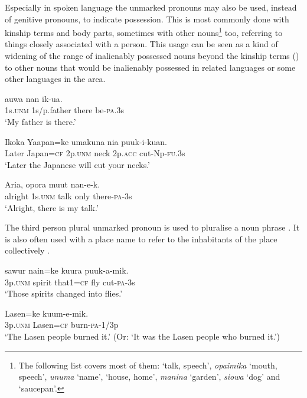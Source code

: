 Especially in spoken language the unmarked pronouns may also be used, instead of genitive pronouns, to indicate possession. This is most commonly done with kinship terms and body parts, sometimes with other nouns\footnote{The following list covers most of them:  `talk, speech', \textit{opaimika} `mouth, speech', \textit{unuma} `name',  `house, home', \textit{manina} `garden', \textit{siowa} `dog' and  `saucepan'.} too, referring to things closely associated with a person. This usage can be seen as a kind of widening of the range of inalienably possessed nouns beyond the kinship terms () to other nouns that would be inalienably possessed in related languages or some other languages in the area. 

\ea%
\label{ex:3:x537}
\gll {} auwa nan ik-ua. \\
1s.\textsc{unm} 1s/p.father there be-\textsc{pa}.3s\\
\glt`My father is there.'
\z

\ea%
\label{ex:3:x538}
\gll Ikoka Yaapan=ke   umakuna nia puuk-i-kuan. \\
Later Japan=\textsc{cf} 2p.\textsc{unm} neck 2p.\textsc{acc} cut-Np-\textsc{fu}.3s\\
\glt`Later the Japanese will cut your necks.'
\z

\ea%
\label{ex:3:x1804}
\gll Aria,  opora muut nan-e-k. \\
alright 1s.\textsc{unm} talk only there-\textsc{pa}-3s\\
\glt`Alright, there is my talk.'
\z

The third person plural unmarked pronoun is used to pluralise a noun phrase . It is also often used with a place name to refer to the inhabitants of the place collectively .

\ea%
\label{ex:3:x625}
\gll {} sawur nain=ke kuura puuk-a-mik. \\
3p.\textsc{unm} spirit that1=\textsc{cf} fly cut-\textsc{pa}-3s\\
\glt`Those spirits changed into flies.'
\z

\ea%
\label{ex:3:x626}
\gll {} Lasen=ke kuum-e-mik. \\
3p.\textsc{unm} Lasen=\textsc{cf} burn-\textsc{pa}-1/3p\\
\glt`The Lasen people burned it.' (Or: `It was the Lasen people who burned it.')
\z

